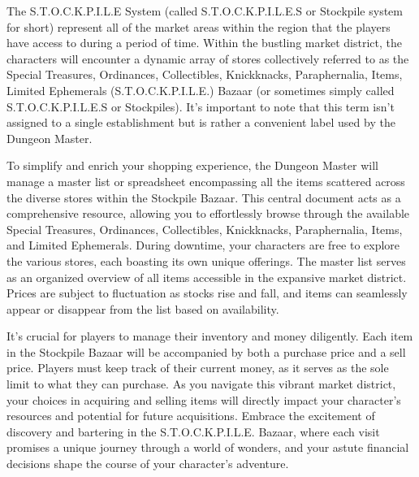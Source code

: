 The S.T.O.C.K.P.I.L.E System (called S.T.O.C.K.P.I.L.E.S or Stockpile system for short) represent all of the market areas within the region that the players have access to during a period of time. Within the bustling market district, the characters will encounter a dynamic array of stores collectively referred to as the Special Treasures, Ordinances, Collectibles, Knickknacks, Paraphernalia, Items, Limited Ephemerals (S.T.O.C.K.P.I.L.E.) Bazaar (or sometimes simply called S.T.O.C.K.P.I.L.E.S or Stockpiles). It's important to note that this term isn't assigned to a single establishment but is rather a convenient label used by the Dungeon Master.

To simplify and enrich your shopping experience, the Dungeon Master will manage a master list or spreadsheet encompassing all the items scattered across the diverse stores within the Stockpile Bazaar. This central document acts as a comprehensive resource, allowing you to effortlessly browse through the available Special Treasures, Ordinances, Collectibles, Knickknacks, Paraphernalia, Items, and Limited Ephemerals. During downtime, your characters are free to explore the various stores, each boasting its own unique offerings. The master list serves as an organized overview of all items accessible in the expansive market district. Prices are subject to fluctuation as stocks rise and fall, and items can seamlessly appear or disappear from the list based on availability.

It's crucial for players to manage their inventory and money diligently. Each item in the Stockpile Bazaar will be accompanied by both a purchase price and a sell price. Players must keep track of their current money, as it serves as the sole limit to what they can purchase. As you navigate this vibrant market district, your choices in acquiring and selling items will directly impact your character's resources and potential for future acquisitions. Embrace the excitement of discovery and bartering in the S.T.O.C.K.P.I.L.E. Bazaar, where each visit promises a unique journey through a world of wonders, and your astute financial decisions shape the course of your character's adventure.
